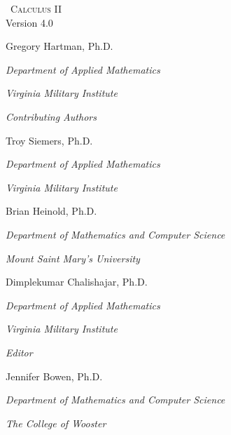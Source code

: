 
\hskip 125pt\begin{minipage}{\textwidth}
\begin{flushright}

\textsc{\large \apex\ {\Huge Calculus II}} \\

{\small Version 4.0}\\

\Large
\vspace{1in}

Gregory Hartman, Ph.D.

\emph{\small Department of Applied Mathematics}

\emph{\small Virginia Military Institute}\vskip15pt

\parbox{200pt}{\textit{Contributing Authors}}\hskip 2cm \phantom{.}

Troy Siemers, Ph.D.

\emph{\small Department of Applied Mathematics}

\emph{\small Virginia Military Institute}\vskip 15pt

Brian Heinold, Ph.D.

\emph{\small Department of Mathematics and Computer Science}

\emph{\small Mount Saint Mary's University}\vskip 15pt

Dimplekumar Chalishajar, Ph.D.

\emph{\small Department of Applied Mathematics}

\emph{\small Virginia Military Institute}\vskip 25pt

\parbox{200pt}{\textit{Editor}}\hskip 2cm \phantom{.}

Jennifer Bowen, Ph.D.

\emph{\small Department of Mathematics and Computer Science}

\emph{\small The College of Wooster}

\normalsize
\end{flushright}
\end{minipage}

